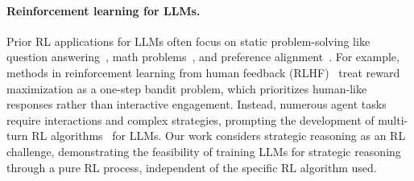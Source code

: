 \paragraph{\textbf{Reinforcement learning for LLMs.}}
Prior RL applications for LLMs often focus on static problem-solving like question answering~\cite{10.5555/3491440.3491941, suzgun-etal-2023-challenging}, math problems~\cite{lightman2024lets, kumar2024training}, and preference alignment~\cite{christiano2017deep, guan2024deliberative}.
For example, methods in reinforcement learning from human feedback (RLHF)~\cite{ouyang2022training, gulcehre2023reinforced, rafailov2024direct} treat reward maximization as a one-step bandit problem, which prioritizes human-like responses rather than interactive engagement.
Instead, numerous agent tasks require interactions and complex strategies, prompting the development of multi-turn RL algorithms~\cite{pmlr-v235-zhou24t, shani2024multiturn} for LLMs. 
Our work considers strategic reasoning as an RL challenge, demonstrating the feasibility of training LLMs for strategic reasoning through a pure RL process, independent of the specific RL algorithm used.